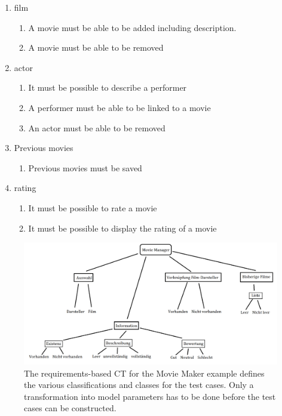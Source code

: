 \begin{enumerate}
\item film	
	\begin{enumerate}
		\item A movie must be able to be added including description.
		\item A movie must be able to be removed
	\end{enumerate}
\item actor
	\begin{enumerate}
		\item It must be possible to describe a performer
		\item A performer must be able to be linked to a movie
		\item An actor must be able to be removed
	\end{enumerate}
\item Previous movies
	\begin{enumerate}
		\item Previous movies must be saved
	\end{enumerate}
\item rating
	\begin{enumerate}
		\item It must be possible to rate a movie
		\item It must be possible to display the rating of a movie
	\end{enumerate}
\end{enumerate}

\begin{figure}[H]
\centering
\includegraphics[scale=0.25]{../../individual/groeger/images/Anforderunsbaum.png} 
\caption{The requirements-based CT for the Movie Maker example defines the various classifications and classes for the test cases. Only a transformation into model parameters has to be done before the test cases can be constructed.}
\label{fig:Movie_Maker_CT}
\end{figure}

